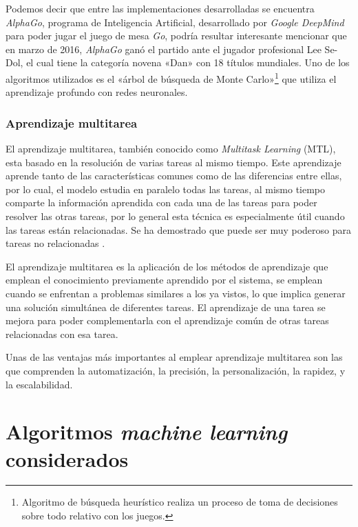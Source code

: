 Podemos decir que entre las implementaciones desarrolladas se encuentra \textit{AlphaGo}, programa de Inteligencia Artificial, desarrollado por \textit{Google DeepMind} para poder jugar el juego de mesa \textit{Go}, podría resultar interesante mencionar que en marzo de 2016, \textit{AlphaGo} ganó el partido ante el jugador profesional Lee Se-Dol, el cual tiene la categoría novena «Dan» con 18 títulos mundiales. Uno de los algoritmos utilizados es el «árbol de búsqueda de Monte Carlo»\footnote{Algoritmo de búsqueda heurístico realiza un proceso de toma de decisiones sobre todo relativo con los juegos.} que utiliza el aprendizaje profundo con redes neuronales.

\subsubsection{Aprendizaje multitarea}

El aprendizaje multitarea, también conocido como \textit{Multitask Learning} (MTL), esta basado en la resolución de varias tareas al mismo tiempo. Este aprendizaje aprende tanto de las características comunes como de las diferencias entre ellas, por lo cual, el modelo estudia en paralelo todas las tareas, al mismo tiempo comparte la información aprendida con cada una de las tareas para poder resolver las otras  tareas, por lo general esta técnica es especialmente útil cuando las tareas están relacionadas. Se ha demostrado que puede ser muy poderoso para tareas no relacionadas \cite{CerdaMunoz2021Feb}.

El aprendizaje multitarea es la aplicación de los métodos de aprendizaje que emplean el conocimiento previamente aprendido por el sistema, se emplean cuando se enfrentan a problemas similares a los ya vistos, lo que implica generar una solución simultánea de diferentes tareas. El aprendizaje de una tarea se mejora para poder complementarla con el aprendizaje común de otras tareas relacionadas con esa tarea.

Unas de las ventajas más importantes al emplear aprendizaje multitarea son las que comprenden la automatización, la precisión, la personalización, la rapidez, y la escalabilidad.


\section{Algoritmos \textit{machine learning} considerados}

